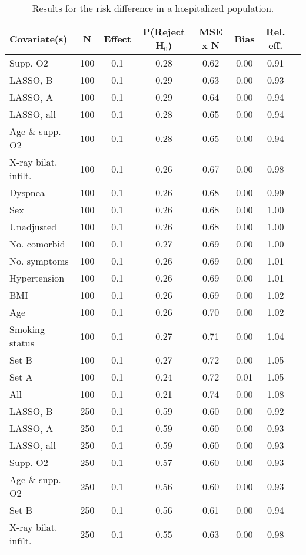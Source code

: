 \documentclass{article}
\begin{document}
{\tabcolsep=6pt  %
\begin{longtable}{lccccccc}
\caption{Results for the risk difference in a hospitalized population.}\label{tab6}\\
Covariate(s) & N & Effect & P(Reject H$_0$) & MSE x N & Bias & Rel. eff.\\ \midrule
Supp. O2 & 100 & 0.1 & 0.28 & 0.62 & 0.00 & 0.91\\
LASSO, B & 100 & 0.1 & 0.29 & 0.63 & 0.00 & 0.93\\
LASSO, A & 100 & 0.1 & 0.29 & 0.64 & 0.00 & 0.94\\
LASSO, all & 100 & 0.1 & 0.28 & 0.65 & 0.00 & 0.94\\
Age \& supp. O2 & 100 & 0.1 & 0.28 & 0.65 & 0.00 & 0.94\\
X-ray bilat. infilt. & 100 & 0.1 & 0.26 & 0.67 & 0.00 & 0.98\\
Dyspnea & 100 & 0.1 & 0.26 & 0.68 & 0.00 & 0.99\\
Sex & 100 & 0.1 & 0.26 & 0.68 & 0.00 & 1.00\\
Unadjusted & 100 & 0.1 & 0.26 & 0.68 & 0.00 & 1.00\\
No. comorbid & 100 & 0.1 & 0.27 & 0.69 & 0.00 & 1.00\\
No. symptoms & 100 & 0.1 & 0.26 & 0.69 & 0.00 & 1.01\\
Hypertension & 100 & 0.1 & 0.26 & 0.69 & 0.00 & 1.01\\
BMI & 100 & 0.1 & 0.26 & 0.69 & 0.00 & 1.02\\
Age & 100 & 0.1 & 0.26 & 0.70 & 0.00 & 1.02\\
Smoking status & 100 & 0.1 & 0.27 & 0.71 & 0.00 & 1.04\\
Set B & 100 & 0.1 & 0.27 & 0.72 & 0.00 & 1.05\\
Set A & 100 & 0.1 & 0.24 & 0.72 & 0.01 & 1.05\\
All & 100 & 0.1 & 0.21 & 0.74 & 0.00 & 1.08\\ \midrule
LASSO, B & 250 & 0.1 & 0.59 & 0.60 & 0.00 & 0.92\\
LASSO, A & 250 & 0.1 & 0.59 & 0.60 & 0.00 & 0.93\\
LASSO, all & 250 & 0.1 & 0.59 & 0.60 & 0.00 & 0.93\\
Supp. O2 & 250 & 0.1 & 0.57 & 0.60 & 0.00 & 0.93\\
Age \& supp. O2 & 250 & 0.1 & 0.56 & 0.60 & 0.00 & 0.93\\
Set B & 250 & 0.1 & 0.56 & 0.61 & 0.00 & 0.94\\
X-ray bilat. infilt. & 250 & 0.1 & 0.55 & 0.63 & 0.00 & 0.98\\

\end{longtable}}
\end{document}
